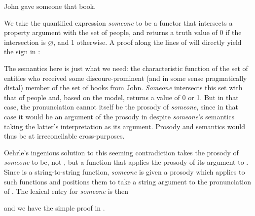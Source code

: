 \documentclass[output=paper,colorlinks,citecolor=brown]{langscibook}
\begin{document}
\begin{exe}
 \ex\label{someone}
  John gave someone that book.
\end{exe}
We take the quantified expression \textit{someone} to be a functor that
intersects a property argument with the set of people, and returns a
truth value of 0 if the intersection is $\varnothing$, and 1
otherwise. A proof along the lines of  will directly yield the
sign in :

\begin{exe}
 \ex\label{gaveTerm}
\end{exe}
The semantics here is just what we need: the characteristic function
of the set of entities who received some discoure-prominent (and in
some sense pragmatically distal) member of the set of books from
John. \textit{Someone} intersects this set with that of people and, based on
the model, returns a value of 0 or 1. But in that case, the pronunciation
 cannot itself be the prosody of \textit{someone}, since in that
case it would be an argument of the prosody in  despite
\textit{someone}'s semantics taking the latter's
interpretation as its argument. Prosody and semantics would thus be at
irreconcilable cross-purposes.

Oehrle's ingenious solution to this seeming contradiction takes the
prosody of \textit{someone} to be, not , but a function that
applies the prosody of its  argument to . Since
 is a string-to-string
function, \textit{someone} is given a prosody which applies to such functions
and positions them to take a string argument  to the
pronunciation of . The lexical entry for \textit{someone} is then

\begin{exe}
 \ex\label{someoneEntry}
\end{exe}
and we have the simple proof in .
\end{document}
